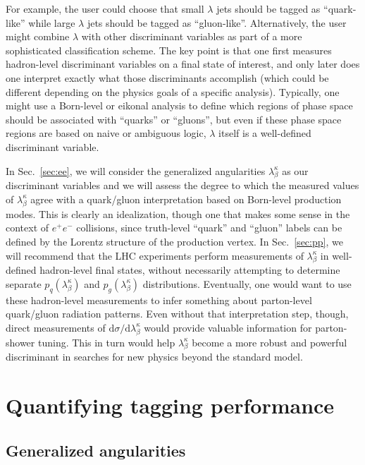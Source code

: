 \documentclass[11pt,letterpaper]{article}
\DeclareRobustCommand{\Sec}[1]{Sec.~\ref{#1}}
\begin{document}
For example, the user could choose that small $\lambda$ jets should be tagged as ``quark-like'' while large $\lambda$ jets should be tagged as ``gluon-like''. Alternatively, the user might combine $\lambda$ with other discriminant variables as part of a more sophisticated classification scheme.  The key point is that one first measures hadron-level discriminant variables on a final state of interest, and only later does one interpret exactly what those discriminants accomplish (which could be different depending on the physics goals of a specific analysis).  Typically, one might use a Born-level or eikonal analysis to define which regions of phase space should be associated with ``quarks'' or ``gluons'', but even if these phase space regions are based on naive or ambiguous logic, $\lambda$ itself is a well-defined discriminant variable.

In \Sec{sec:ee}, we will consider the generalized
angularities $\lambda_{\beta}^\kappa$ as our discriminant variables
and we will assess the degree to which the measured values of
$\lambda_{\beta}^\kappa$ agree with a quark/gluon interpretation based
on Born-level production modes.  This is clearly an idealization,
though one that makes some sense in the context of $e^+e^-$
collisions, since  truth-level ``quark'' and ``gluon'' labels can be
defined by the Lorentz structure of the production vertex.  In
\Sec{sec:pp}, we will recommend that the LHC
experiments perform measurements of $\lambda_\beta^\kappa$ in
well-defined hadron-level final states, without necessarily attempting
to determine separate $p_q(\lambda_\beta^\kappa)$ and
$p_g(\lambda_\beta^\kappa)$ distributions.  Eventually, one would want
to use these hadron-level measurements to infer something about
parton-level quark/gluon radiation patterns.  Even without that
interpretation step, though, direct measurements of $\text{d} \sigma /
\text{d} \lambda_\beta^\kappa$ would provide valuable information for
parton-shower tuning.  This in turn would help $\lambda_\beta^\kappa$ become a more robust and powerful discriminant in searches for new physics beyond the standard model. 

\section{Quantifying tagging performance}
\label{sec:preliminaries}

\subsection{Generalized angularities}
\label{sec:genang}
\end{document}
